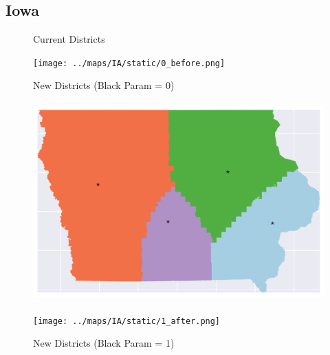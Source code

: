 \subsection{Iowa}
\begin{figure}[htb!] \centering
\caption{ Current Districts }
\texttt{[image: ../maps/IA/static/0\_before.png]}
\caption{ New Districts (Black Param = 0) }
\includegraphics[width=5in,height=3in,keepaspectratio]{../maps/IA/static/0_after.png}
\caption{ New Districts (Black Param = 1) }
\texttt{[image: ../maps/IA/static/1\_after.png]}
\end{figure}

\clearpage
\newpage

